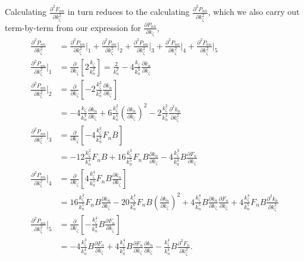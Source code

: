 \documentclass{article}
\begin{document}
Calculating $\frac{\partial^2 F_{nn}}{\partial k_{\zeta}^2}$ in turn reduces to the calculating $\frac{\partial^2 P_{nn}}{\partial k_{\zeta}^2}$, which we also carry out term-by-term from our expression for $\frac{\partial P_{nn}}{\partial k_{\zeta}}$,
\begin{align}
\frac{\partial^2 P_{nn}}{\partial k_{\zeta}^2} &= \frac{\partial^2 P_{nn}}{\partial k_{\zeta}^2}\bigg|_{1} + \frac{\partial^2 P_{nn}}{\partial k_{\zeta}^2}\bigg|_{2} + \frac{\partial^2 P_{nn}}{\partial k_{\zeta}^2}\bigg|_{3} + \frac{\partial^2 P_{nn}}{\partial k_{\zeta}^2}\bigg|_{4} + \frac{\partial^2 P_{nn}}{\partial k_{\zeta}^2}\bigg|_{5} \\
\frac{\partial^2 P_{nn}}{\partial k_{\zeta}^2}\bigg|_{1} &= \frac{\partial}{\partial k_{\zeta}} \left[2 \frac{k_{\zeta}}{k_{n}^2} \right] = \frac{2}{k_{n}^2} - 4 \frac{k_{\zeta}}{k_{n}^3} \frac{\partial k_{n}}{\partial k_{\zeta}} \\
\frac{\partial^2 P_{nn}}{\partial k_{\zeta}^2}\bigg|_{2} &= \frac{\partial}{\partial k_{\zeta}} \left[-2 \frac{k_{\zeta}^2}{k_{n}^3} \frac{\partial k_{n}}{\partial k_{\zeta}} \right] \\
&= - 4 \frac{k_{\zeta}}{k_{n}^3} \frac{\partial k_{n}}{\partial k_{\zeta}} + 6 \frac{k_{\zeta}^2}{k_{n}^4} \left(\frac{\partial k_{n}}{\partial k_{\zeta}} \right)^2 - 2 \frac{k_{\zeta}^2}{k_{n}^3} \frac{\partial^2 k_{n}}{\partial k_{\zeta}^2} \\
\frac{\partial^2 P_{nn}}{\partial k_{\zeta}^2}\bigg|_{3} &= \frac{\partial}{\partial k_{\zeta}} \left[-4 \frac{k_{\zeta}^3}{k_{n}^4} F_{n} B \right] \\
&= -12 \frac{k_{\zeta}^2}{k_{n}^4} F_{n} B + 16 \frac{k_{\zeta}^3}{k_{n}^5} F_{n} B \frac{\partial k_{n}}{\partial k_{\zeta}} - 4 \frac{k_{\zeta}^3}{k_{n}^4} B \frac{\partial F_{n}}{\partial k_{\zeta}} \\
\frac{\partial^2 P_{nn}}{\partial k_{\zeta}^2}\bigg|_{4} &= \frac{\partial}{\partial k_{\zeta}} \left[ 4 \frac{k_{\zeta}^4}{k_{n}^5} F_{n} B \frac{\partial k_{n}}{\partial k_{\zeta}} \right] \\
&= 16 \frac{k_{\zeta}^3}{k_{n}^5} F_{n} B \frac{\partial k_{n}}{\partial k_{\zeta}} - 20 \frac{k_{\zeta}^4}{k_{n}^6} F_{n} B \left( \frac{\partial k_{n}}{\partial k_{\zeta}} \right)^2 + 4 \frac{k_{\zeta}^4}{k_{n}^5} B \frac{\partial k_{n}}{\partial k_{\zeta}} \frac{\partial F_{n}}{\partial k_{\zeta}} + 4 \frac{k_{\zeta}^4}{k_{n}^5} F_{n} B \frac{\partial^2 k_{n}}{\partial k_{\zeta}^2} \\
\frac{\partial^2 P_{nn}}{\partial k_{\zeta}^2}\bigg|_{5} &= \frac{\partial}{\partial k_{\zeta}} \left[ - \frac{k_{\zeta}^4}{k_{n}^4} B \frac{\partial F_{n}}{\partial k_{\zeta}} \right] \\
&= -4 \frac{k_{\zeta}^3}{k_{n}^4} B \frac{\partial F_{n}}{\partial k_{\zeta}} + 4 \frac{k_{\zeta}^4}{k_{n}^5} B \frac{\partial F_{n}}{\partial k_{\zeta}} \frac{\partial k_{n}}{\partial k_{\zeta}} - \frac{k_{\zeta}^4}{k_{n}^4} B \frac{\partial^2 F_{n}}{\partial k_{\zeta}^2}.
\end{align}
\end{document}
